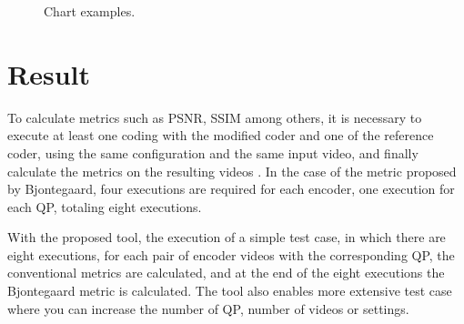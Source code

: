\documentclass[journal]{IEEEtran}
\begin{document}
\FloatBarrier
\begin{figure}[!htb]
	\centering
	\caption{Chart examples.}
	\quad %
\end{figure}
\FloatBarrier

	


\section{Result}


To calculate metrics such as PSNR, SSIM among others, it is necessary to execute at least one coding with the modified coder and one of the reference coder, using the same configuration and the same input video, and finally calculate the metrics on the resulting videos . In the case of the metric proposed by Bjontegaard, four executions are required for each encoder, one execution for each QP, totaling eight executions.


With the proposed tool, the execution of a simple test case, in which there are eight executions, for each pair of encoder videos with the corresponding QP, the conventional metrics are calculated, and at the end of the eight executions the Bjontegaard metric is calculated. The tool also enables more extensive test case where you can increase the number of QP, number of videos or settings.
\end{document}
